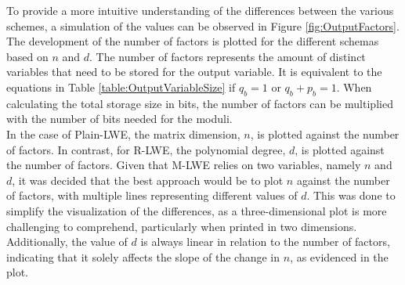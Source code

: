 To provide a more intuitive understanding of the differences between the various schemes, a simulation of the values can be observed in Figure \ref{fig:OutputFactors}. The development of the number of factors is plotted for the different schemas based on $n$ and $d$.
The number of factors represents the amount of distinct variables that need to be stored for the output variable. It is equivalent to the equations in Table \ref{table:OutputVariableSize} if $q_b=1$ or $q_b+p_b = 1$. When calculating the total storage size in bits, the number of factors can be multiplied with the number of bits needed for the moduli. \\
In the case of Plain-LWE, the matrix dimension, $n$, is plotted against the number of factors. In contrast, for R-LWE, the polynomial degree, $d$, is plotted against the number of factors. Given that M-LWE relies on two variables, namely $n$ and $d$, it was decided that the best approach would be to plot $n$ against the number of factors, with multiple lines representing different values of $d$. This was done to simplify the visualization of the differences, as a three-dimensional plot is more challenging to comprehend, particularly when printed in two dimensions. Additionally, the value of $d$ is always linear in relation to the number of factors, indicating that it solely affects the slope of the change in $n$, as evidenced in the plot.


